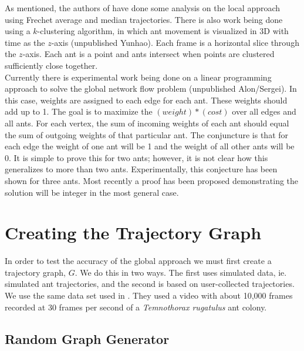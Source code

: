 \documentclass[12pt]{article}
\begin{document}
\indent As mentioned, the authors of \cite{Joy12} have done some analysis on the local approach using Frechet average and median trajectories. There is also work being done using a $k$-clustering algorithm, in which ant movement is visualized in 3D with time as the $z$-axis (unpublished Yunhao). Each frame is a horizontal slice through the $z$-axis. Each ant is a point and ants intersect when points are clustered sufficiently close together. \\
\indent Currently there is experimental work being done on a linear programming approach to solve the global network flow problem (unpublished Alon/Sergei). In this case, weights are assigned to each edge for each ant. These weights should add up to 1. The goal is to maximize the $(weight)*(cost)$ over all edges and all ants.  For each vertex, the sum of incoming weights of each ant should equal the sum of outgoing weights of that particular ant. The conjuncture is that for each edge the weight of one ant will be 1 and the weight of all other ants will be 0. It is simple to prove this for two ants; however, it is not clear how this generalizes to more than two ants. Experimentally, this conjecture has been shown for three ants. Most recently a proof has been proposed demonstrating the solution will be integer in the most general case. \\



\section{Creating the Trajectory Graph}
In order to test the accuracy of the global approach we must first create a trajectory graph, $G$. We do this in two ways. The first uses simulated data, ie. simulated ant trajectories, and the second is based on user-collected trajectories. We use the same data set used in \cite{Joy12}. They used a video with about 10,000 frames recorded at 30 frames per second of a {\it Temnothorax rugatulus} ant colony. 
\subsection{Random Graph Generator}
\end{document}
